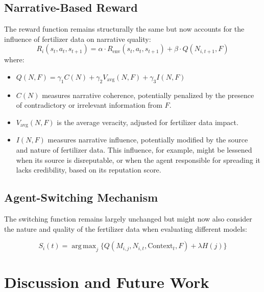 \documentclass[12pt, a4paper]{article}
\DeclareMathOperator*{\argmax}{arg\,max}
\begin{document}
\subsection{Narrative-Based Reward}
The reward function remains structurally the same but now accounts for the influence of fertilizer data on narrative quality:
\begin{equation}
    R_i(s_t, a_t, s_{t+1}) = \alpha \cdot R_{\text{env}}(s_t, a_t, s_{t+1}) + \beta \cdot Q(N_{i,t+1}, F)
\end{equation}
where:
\begin{itemize}
    \item \( Q(N, F) = \gamma_1 C(N) + \gamma_2 V_{\text{avg}}(N, F) + \gamma_3 I(N, F) \)
    \item \( C(N) \) measures narrative coherence, potentially penalized by the presence of contradictory or irrelevant information from \( F \).
    \item \( V_{\text{avg}}(N, F) \) is the average veracity, adjusted for fertilizer data impact.
    \item \( I(N, F) \) measures narrative influence, potentially modified by the source and nature of fertilizer data. This influence, for example, might be lessened when its source is disreputable, or when the agent responsible for spreading it lacks credibility, based on its reputation score.
\end{itemize}

\subsection{Agent-Switching Mechanism}
The switching function remains largely unchanged but might now also consider the nature and quality of the fertilizer data when evaluating different models:

\begin{equation}
    S_i(t) = \argmax_{j} \{Q(M_{i,j}, N_{i,t}, \text{Context}_t, F) + \lambda H(j)\}
\end{equation}

\section{Discussion and Future Work}
\end{document}
